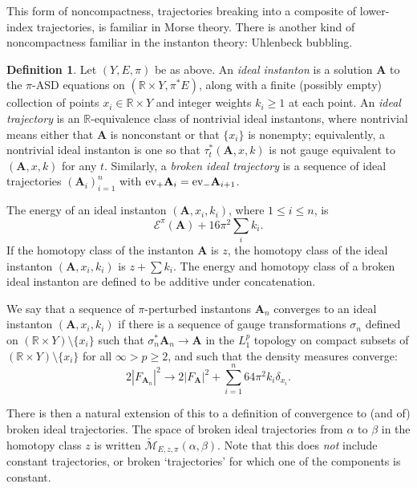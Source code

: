 \documentclass[10pt,a4paper]{amsart}
\newcommand{\pE}{\pi^* \! E}
\theoremstyle{definition}
\newtheorem{definition}[theorem]{Definition}
\theoremstyle{remark}
\numberwithin{figure}{qchap}
\begin{document}
This form of noncompactness, trajectories breaking into a composite of lower-index trajectories, is familiar in Morse theory. There is another kind of noncompactness familiar in the instanton theory: Uhlenbeck bubbling.

\begin{definition}Let $(Y,E,\pi)$ be as above. An \emph{ideal instanton} is a solution $\mathbf{A}$ to the $\pi$-ASD equations on $(\mathbb R \times Y, \pE)$, along with a finite (possibly empty) collection of points $x_i \in \mathbb R \times Y$ and integer weights $k_i \geq 1$ at each point. An \emph{ideal trajectory} is an $\mathbb R$-equivalence class of nontrivial ideal instantons, where nontrivial means either that $\mathbf{A}$ is nonconstant or that $\{x_i\}$ is nonempty; equivalently, a nontrivial ideal instanton is one so that $\tau_t^*(\mathbf{A},x,k)$ is not gauge equivalent to $(\mathbf{A},x,k)$ for any $t$. Similarly, a \emph{broken ideal trajectory} is a sequence of ideal trajectories $(\mathbf{A}_i)_{i=1}^n$ with $\textup{ev}_+ \mathbf{A}_i = \textup{ev}_- \mathbf{A}_{i+1}$.

The energy of an ideal instanton $(\mathbf{A},x_i,k_i)$, where $1 \leq i \leq n$, is 
$$\mathcal E^\pi(\mathbf{A}) + 16\pi^2 \sum_i k_i.$$ 
If the homotopy class of the instanton $\mathbf{A}$ is $z$, the homotopy class of the ideal instanton $(\mathbf{A},x_i,k_i)$ is $z + \sum k_i$. The energy and homotopy class of a broken ideal instanton are defined to be additive under concatenation.
\end{definition}

We say that a sequence of $\pi$-perturbed instantons $\mathbf{A}_n$ converges to an ideal instanton $(\mathbf{A},x_i,k_i)$ if there is a sequence of gauge transformations $\sigma_n$ defined on $(\mathbb R \times Y) \setminus \{x_i\}$ such that $\sigma_n^* \mathbf{A}_n \to \mathbf{A}$ in the $L^p_1$ topology on compact subsets of $(\mathbb R \times Y) \setminus \{x_i\}$ for all $\infty > p \geq 2$, and such that the density measures converge: 
$$2|F_{\mathbf{A}_n}|^2 \to 2|F_{\mathbf{A}}|^2 + \sum_{i=1}^n 64\pi^2 k_i \delta_{x_i}.$$

There is then a natural extension of this to a definition of convergence to (and of) broken ideal trajectories. The space of broken ideal trajectories from $\alpha$ to $\beta$ in the homotopy class $z$ is written $\check{\mathcal M}_{E,z,\pi}(\alpha, \beta)$. Note that this does \emph{not} include constant trajectories, or broken `trajectories' for which one of the components is constant.
\end{document}
